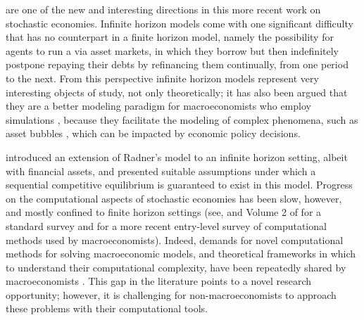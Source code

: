  are one of the new and interesting directions in this more recent work on stochastic economies.
Infinite horizon models come with one significant difficulty that has no counterpart in a finite horizon model, namely the possibility for agents to run a  via asset markets, in which they borrow but then indefinitely postpone repaying their debts by refinancing them continually, from one period to the next.
From this perspective infinite horizon models represent very interesting objects of study, not only theoretically; it has also been argued that they are a better modeling paradigm for macroeconomists who employ simulations \cite{magill1994infinite}, because they facilitate the modeling of complex phenomena, such as asset bubbles \cite{huang2000asset}, which can be impacted by economic policy decisions.

\citet{magill1994infinite} introduced an extension of Radner's model to an infinite horizon setting, albeit with financial assets, 
and presented suitable assumptions under which a sequential competitive equilibrium is guaranteed to exist in this model.
Progress on the computational aspects of stochastic economies has been slow, however, and mostly confined to finite horizon settings
(see, \citet{sargent2000recursive} and Volume 2 of \citet{taylor1999handbook} for a standard survey and \citet{FernandezVillaverde2023CompMethodsMacro}  for a more recent entry-level survey of computational methods used by macroeconomists).
Indeed, demands for novel computational methods for solving macroeconomic models, and theoretical frameworks in which to understand their computational complexity, have been repeatedly shared by macroeconomists \cite{taylor1999handbook}. 
This gap in the literature points to a novel research opportunity; however, it is challenging for non-macroeconomists 
to approach these problems with their computational tools. 

